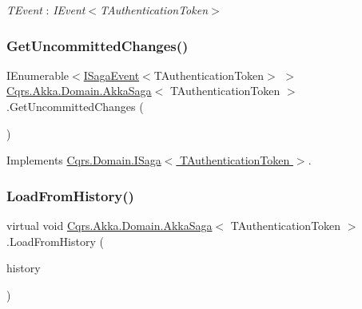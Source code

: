 \begin{Desc}
\item[Type Constraints]\begin{description}
\item[{\em T\+Event} : {\em I\+Event$<$T\+Authentication\+Token$>$}]\end{description}
\end{Desc}
\mbox{\label{classCqrs_1_1Akka_1_1Domain_1_1AkkaSaga_ac88061e29e3e2223db31ce9075835b46_ac88061e29e3e2223db31ce9075835b46}} 
\subsubsection{\texorpdfstring{Get\+Uncommitted\+Changes()}{GetUncommittedChanges()}}
{\footnotesize\ttfamily I\+Enumerable$<$\hyperlink{interfaceCqrs_1_1Events_1_1ISagaEvent}{I\+Saga\+Event}$<$T\+Authentication\+Token$>$ $>$ \hyperlink{classCqrs_1_1Akka_1_1Domain_1_1AkkaSaga}{Cqrs.\+Akka.\+Domain.\+Akka\+Saga}$<$ T\+Authentication\+Token $>$.Get\+Uncommitted\+Changes (\begin{DoxyParamCaption}{ }\end{DoxyParamCaption})}



Implements \hyperlink{interfaceCqrs_1_1Domain_1_1ISaga_abb77811b4f7d19adb61f9d33da18e7e0_abb77811b4f7d19adb61f9d33da18e7e0}{Cqrs.\+Domain.\+I\+Saga$<$ T\+Authentication\+Token $>$}.

\mbox{\label{classCqrs_1_1Akka_1_1Domain_1_1AkkaSaga_a40b859bc15c2f7c87a21b07f9bc9548c_a40b859bc15c2f7c87a21b07f9bc9548c}} 
\subsubsection{\texorpdfstring{Load\+From\+History()}{LoadFromHistory()}}
{\footnotesize\ttfamily virtual void \hyperlink{classCqrs_1_1Akka_1_1Domain_1_1AkkaSaga}{Cqrs.\+Akka.\+Domain.\+Akka\+Saga}$<$ T\+Authentication\+Token $>$.Load\+From\+History (\begin{DoxyParamCaption}\item[{I\+Enumerable$<$ \hyperlink{interfaceCqrs_1_1Events_1_1ISagaEvent}{I\+Saga\+Event}$<$ T\+Authentication\+Token $>$$>$}]{history }\end{DoxyParamCaption})\hspace{0.3cm}{\ttfamily [virtual]}}



